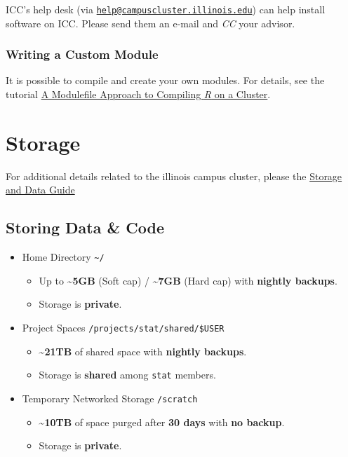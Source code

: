 \documentclass[
  letterpaper,
  DIV=11,
  numbers=noendperiod]{scrreport}
\providecommand{\tightlist}{%
  \setlength{\itemsep}{0pt}\setlength{\parskip}{0pt}}\usepackage{longtable,booktabs,array}
\begin{document}
ICC's help desk (via
\href{mailto:help@campuscluster.illinois.edu}{\nolinkurl{help@campuscluster.illinois.edu}})
can help install software on ICC. Please send them an e-mail and
\emph{CC} your advisor.

\hypertarget{writing-a-custom-module}{%
\subsection{Writing a Custom Module}\label{writing-a-custom-module}}

It is possible to compile and create your own modules. For details, see
the tutorial
\href{http://thecoatlessprofessor.com/programming/a-modulefile-approach-to-compiling-r-on-a-cluster/}{A
Modulefile Approach to Compiling \emph{R} on a Cluster}.

\hypertarget{cluster-storage}{%
\chapter{Storage}\label{cluster-storage}}

For additional details related to the illinois campus cluster, please
the
\href{https://campuscluster.illinois.edu/resources/docs/storage-and-data-guide/}{Storage
and Data Guide}

\hypertarget{storing-data-code}{%
\section{Storing Data \& Code}\label{storing-data-code}}

\begin{itemize}
\tightlist
\item
  Home Directory \texttt{\textasciitilde{}/}

  \begin{itemize}
  \tightlist
  \item
    Up to \textbf{\textasciitilde5GB} (Soft cap) /
    \textbf{\textasciitilde7GB} (Hard cap) with \textbf{nightly
    backups}.
  \item
    Storage is \textbf{private}.
  \end{itemize}
\item
  Project Spaces \texttt{/projects/stat/shared/\$USER}

  \begin{itemize}
  \tightlist
  \item
    \textbf{\textasciitilde21TB} of shared space with \textbf{nightly
    backups}.
  \item
    Storage is \textbf{shared} among \texttt{stat} members.
  \end{itemize}
\item
  Temporary Networked Storage \texttt{/scratch}

  \begin{itemize}
  \tightlist
  \item
    \textbf{\textasciitilde10TB} of space purged after \textbf{30 days}
    with \textbf{no backup}.
  \item
    Storage is \textbf{private}.
  \end{itemize}
\end{itemize}
\end{document}
